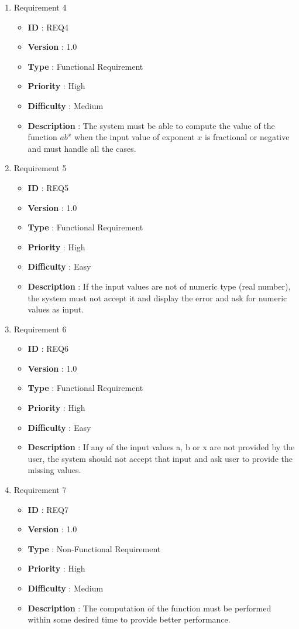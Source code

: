 \documentclass[12pt, a4paper]{article}
\begin{document}
\begin{enumerate}
	    
	\item{} Requirement 4
	\begin{itemize}
		\item \textbf{ID} : REQ4
		\item \textbf{Version} : 1.0
		\item \textbf{Type} : Functional Requirement
		\item \textbf{Priority} : High
		\item \textbf{Difficulty} : Medium
		\item \textbf{Description} : The system must be able to compute the value of the function $ab^x$ when the input value of exponent $x$ is fractional or negative and must handle all the cases.
	\end{itemize}
	        
	\item{} Requirement 5
	\begin{itemize}
		\item \textbf{ID} : REQ5
		\item \textbf{Version} : 1.0
		\item \textbf{Type} : Functional Requirement
		\item \textbf{Priority} : High
		\item \textbf{Difficulty} : Easy
		\item \textbf{Description} : If the input values are not of numeric type (real number), the system must not accept it and display the error and ask for numeric values as input.
	\end{itemize}
	    
	\item{} Requirement 6
	\begin{itemize}
		\item \textbf{ID} : REQ6
		\item \textbf{Version} : 1.0
		\item \textbf{Type} : Functional Requirement
		\item \textbf{Priority} : High
		\item \textbf{Difficulty} : Easy
		\item \textbf{Description} : If any of the input values a, b or x are not provided by the user, the system should not accept that input and ask user to provide the missing values. 
	\end{itemize}
	    
	 
	    
	     
	\item{} Requirement 7
	\begin{itemize}
		\item \textbf{ID} : REQ7
		\item \textbf{Version} : 1.0
		\item \textbf{Type} : Non-Functional Requirement
		\item \textbf{Priority} : High
		\item \textbf{Difficulty} : Medium
		\item \textbf{Description} : The computation of the function must be performed within some desired time to provide better performance.
	\end{itemize}
	    

\end{enumerate}
\end{document}
